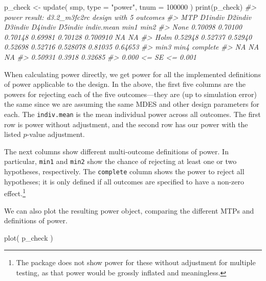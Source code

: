 \documentclass[
]{article}
\newenvironment{Shaded}{\begin{snugshade}}{\end{snugshade}}
\newcommand{\AttributeTok}[1]{\textcolor[rgb]{0.77,0.63,0.00}{#1}}
\newcommand{\CommentTok}[1]{\textcolor[rgb]{0.56,0.35,0.01}{\textit{#1}}}
\newcommand{\DecValTok}[1]{\textcolor[rgb]{0.00,0.00,0.81}{#1}}
\newcommand{\FunctionTok}[1]{\textcolor[rgb]{0.00,0.00,0.00}{#1}}
\newcommand{\NormalTok}[1]{#1}
\newcommand{\OtherTok}[1]{\textcolor[rgb]{0.56,0.35,0.01}{#1}}
\newcommand{\StringTok}[1]{\textcolor[rgb]{0.31,0.60,0.02}{#1}}
\begin{document}
\begin{Shaded}
\begin{Highlighting}[]
\NormalTok{p\_check }\OtherTok{\textless{}{-}} \FunctionTok{update}\NormalTok{( smp, }\AttributeTok{type =} \StringTok{"power"}\NormalTok{, }\AttributeTok{tnum =} \DecValTok{100000}\NormalTok{ )}
\FunctionTok{print}\NormalTok{(p\_check)}
\CommentTok{\#\textgreater{} power result: d3.2\_m3fc2rc design with 5 outcomes}
\CommentTok{\#\textgreater{}   MTP D1indiv D2indiv D3indiv D4indiv D5indiv indiv.mean    min1    min2}
\CommentTok{\#\textgreater{}  None 0.70098 0.70100 0.70148 0.69981 0.70128   0.700910      NA      NA}
\CommentTok{\#\textgreater{}  Holm 0.52948 0.52737 0.52940 0.52698 0.52716   0.528078 0.81035 0.64653}
\CommentTok{\#\textgreater{}     min3   min4 complete}
\CommentTok{\#\textgreater{}       NA     NA       NA}
\CommentTok{\#\textgreater{}  0.50931 0.3918  0.32685}
\CommentTok{\#\textgreater{}  0.000 \textless{}= SE \textless{}= 0.001}
\end{Highlighting}
\end{Shaded}

When calculating power directly, we get power for all the implemented
definitions of power applicable to the design. In the above, the first
five columns are the powers for rejecting each of the five
outcomes---they are (up to simulation error) the same since we are
assuming the same MDES and other design parameters for each. The
\texttt{indiv.mean} is the mean individual power across all outcomes.
The first row is power without adjustment, and the second row has our
power with the listed \(p\)-value adjustment.

The next columns show different multi-outcome definitions of power. In
particular, \texttt{min1} and \texttt{min2} show the chance of rejecting
at least one or two hypotheses, respectively. The \texttt{complete}
column shows the power to reject all hypotheses; it is only defined if
all outcomes are specified to have a non-zero
effect.\footnote{The package does not show power for these without adjustment for multiple testing, as that power would be grossly inflated and meaningless.}

We can also plot the resulting power object, comparing the different
MTPs and definitions of power.

\begin{Shaded}
\begin{Highlighting}[]
\FunctionTok{plot}\NormalTok{( p\_check )}
\end{Highlighting}
\end{Shaded}
\end{document}
